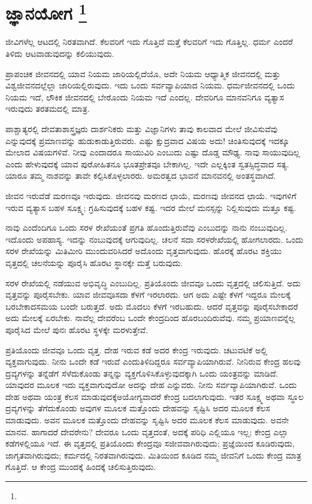 
\chapter[ಜ್ಞಾನಯೋಗ ]{ಜ್ಞಾನಯೋಗ \protect\footnote{}}

ಜೀವಿಗಳೆಲ್ಲ ಆಟದಲ್ಲಿ ನಿರತವಾಗಿದೆ. ಕೆಲವರಿಗೆ ಇದು ಗೊತ್ತಿದೆ ಮತ್ತೆ ಕೆಲವರಿಗೆ ಇದು ಗೊತ್ತಿಲ್ಲ. ಧರ್ಮ ಎಂದರೆ ತಿಳಿದು ಆಟವಾಡುವುದನ್ನು ಕಲಿಯುವುದು.

ಪ್ರಾಪಂಚಿಕ ಜೀವನದಲ್ಲಿ ಯಾವ ನಿಯಮ ಜಾರಿಯಲ್ಲಿದೆಯೊ, ಅದೇ ನಿಯಮ ಆಧ್ಯಾತ್ಮಿಕ ಜೀವನದಲ್ಲಿ ಮತ್ತು ವಿಶ್ವಜೀವನದಲ್ಲೆಲ್ಲಾ ಜಾರಿಯಲ್ಲಿರುವುದು. ಇದು ಒಂದು ಸರ್ವವ್ಯಾಪಿಯಾದ ನಿಯಮ. ಧರ್ಮಜೀವನದಲ್ಲಿ ಒಂದು ನಿಯಮ ಇದೆ, ಲೌಕಿಕ ಜೀವನದಲ್ಲಿ ಬೇರೊಂದು ನಿಯಮ ಇದೆ ಎಂದಲ್ಲ. ದೇವರಿಗೂ ಮಾನವನಿಗೂ ವ್ಯತ್ಯಾಸ ಇರುವುದು ತರತಮದಲ್ಲಿ ಮಾತ್ರ.

ಪಾಶ್ಚಾತ್ಯರಲ್ಲಿ ದೇವತಾಶಾಸ್ತ್ರಜ್ಞರು ದಾರ್ಶನಿಕರು ಮತ್ತು ವಿಜ್ಞಾನಿಗಳು ತಾವು ಕಾಲವಾದ ಮೇಲೆ ಜೀವಿಸುವೆವು ಎನ್ನುವುದಕ್ಕೆ ಪ್ರಮಾಣವನ್ನು ಹುಡುಕಾಡುತ್ತಿರುವರು. ಎಷ್ಟು ಕ್ಷುದ್ರವಾದ ವಿಷಯ ಅದು! ಚಿಂತಿಸುವುದಕ್ಕೆ ಇದಕ್ಕೂ ಮೇಲಾದ ವಿಷಯಗಳಿವೆ. ನೀವು ಎಂದಾದರೂ ಸಾಯುವಿರಿ ಎಂಬುದು ಎಷ್ಟು ದೊಡ್ಡ ಮೌಢ್ಯ. ನಾವು ಸಾಯುವುದಿಲ್ಲ ಎಂದು ಹೇಳುವುದಕ್ಕೆ ಯಾವ ಪುರೋಹಿತನೂ ಭೂತಪ್ರೇತವೂ ಬೇಕಾಗಿಲ್ಲ. ಇದೇ ಎಲ್ಲಕ್ಕಿಂತ ಸ್ವತಸ್ಸಿದ್ಧವಾದ ಸತ್ಯ. ಯಾರೂ ತಮ್ಮ ನಾಶವನ್ನು ತಾವೇ ಕಲ್ಪಿಸಿಕೊಳ್ಳಲಾರರು. ಅಮರತ್ವದ ಭಾವನೆ ಮಾನವನಲ್ಲಿ ಅಂತಸ್ಥವಾಗಿದೆ.

ಜೀವನ ಇರುವೆಡೆ ಮರಣವೂ ಇರುವುದು. ಜೀವನವು ಮರಣದ ಛಾಯೆ, ಮರಣವು ಜೀವನದ ಛಾಯೆ. ಇವುಗಳಿಗೆ ಇರುವ ವ್ಯತ್ಯಾಸ ಬಹಳ ಸೂಕ್ಷ್ಮ; ಗ್ರಹಿಸುವುದಕ್ಕೆ ಬಹಳ ಕಷ್ಟ. ಇದರ ಮೇಲೆ ಮನಸ್ಸನ್ನು ನಿಲ್ಲಿಸುವುದು ಮತ್ತೂ ಕಷ್ಟ.

ನಾವು ಎಂದೆಂದಿಗೂ ಒಂದು ಸರಳ ರೇಖೆಯಂತೆ ಪ್ರಗತಿ ಹೊಂದುತ್ತಿರುವೆವು ಎಂಬುದನ್ನು ನಾನು ನಂಬುವುದಿಲ್ಲ. ಇದೊಂದು ಅಪಹಾಸ್ಯ. ಇದನ್ನು ನಂಬುವುದಕ್ಕೆ ಆಗುವುದಿಲ್ಲ. ಚಲನೆ ಸದಾ ಸರಳರೇಖೆಯಲ್ಲಿ ಹೋಗಲಾರದು. ಒಂದು ಸರಳ ರೇಖೆಯನ್ನು ಮಿತಿಮೀರಿ ಮುಂದುವರಿಸಿದರೆ ಅದೊಂದು ವೃತ್ತವಾಗುವುದು. ಹೊರಕ್ಕೆ ಹೊರಟ ಶಕ್ತಿಯು ವೃತ್ತದಲ್ಲಿ ಚಲನೆಯನ್ನು ಪೂರೈಸಿ ಹೊರಟ ಸ್ಥಾನಕ್ಕೇ ಮತ್ತೆ ಬರುವುದು.

ಸರಳ ರೇಖೆಯಲ್ಲಿ ನಡೆಯುವ ಅಭಿವೃದ್ಧಿ ಎಂಬುದಿಲ್ಲ. ಪ್ರತಿಯೊಂದು ಜೀವವೂ ಒಂದು ವೃತ್ತದಲ್ಲಿ ಚಲಿಸುತ್ತಿದೆ. ಅದು ವೃತ್ತವನ್ನು ಪೂರೈಸಬೇಕು. ಯಾವ ಜೀವವೂ\break ಸದಾ ಕೆಳಗೆ ಇರಲಾರದು. ಆಗ ಅದು ಎಷ್ಟೇ ಕೆಳಗೆ ಇದ್ದರೂ ಮೇಲಕ್ಕೆ ಬರಬೇಕಾದ\break ಸಮಯ ಬಂದೇ ಬರುತ್ತದೆ. ಅದು ಮೊದಲು ಕೆಳಗೆ ಇರಬಹುದು. ಆದರೆ ವೃತ್ತವನ್ನು ಪೂರೈಸಬೇಕಾದರೆ ಅದು ಮೇಲಕ್ಕೆ ಏರಬೇಕು. ನಾವೆಲ್ಲ ದೇವರೆಂಬ ಒಂದೇ ಕೇಂದ್ರದಿಂದ ಹೊರಬಂದಿರುವೆವು. ನಮ್ಮ ಪ್ರಯಾಣವನ್ನೆಲ್ಲ ಪೂರೈಸಿದ ಮೇಲೆ ಪುನಃ ಹೊರಟ ಸ್ಥಳಕ್ಕೇ ಮರಳುತ್ತೇವೆ.

ಪ್ರತಿಯೊಂದು ಜೀವವೂ ಒಂದು ವೃತ್ತ. ದೇಹ ಇರುವ ಕಡೆ ಅದರ ಕೇಂದ್ರ ಇರುವುದು. ಚಟುವಟಿಕೆ ಅಲ್ಲಿ ವ್ಯಕ್ತವಾಗುವುದು. ನೀನು ಒಂದೇ ಕಡೆ ಇರುವೆ ಎಂದು\break ತಿಳಿದಿದ್ದರೂ ಸರ್ವವ್ಯಾಪಿಯಾಗಿರುವೆ. ನೀನಿರುವ ಕೇಂದ್ರ ಹಲವು ದ್ರವ್ಯಗಳನ್ನು ತನ್ನೆಡೆಗೆ ಸೆಳೆದುಕೊಂಡು ತನ್ನನ್ನು ವ್ಯಕ್ತಗೊಳಿಸಿಕೊಳ್ಳುವುದಕ್ಕಾಗಿ ಒಂದು ಯಂತ್ರವನ್ನು ಮಾಡಿದೆ. ಯಾವುದರ ಮೂಲಕ ಇದು ವ್ಯಕ್ತವಾಗುವುದೋ ಅದನ್ನು ದೇಹ ಎನ್ನುವರು. ನೀನು ಸರ್ವವ್ಯಾಪಿಯಾಗಿರುವೆ. ಒಂದು ದೇಹ ಅಥವಾ ಯಂತ್ರ ಕೆಲಸ ಮಾಡುವುದಕ್ಕೆ\break ಅಯೋಗ್ಯವಾದರೆ ಕೇಂದ್ರ ಬದಲಾಗುವುದು. ಇತರ ಸೂಕ್ಷ್ಮ ಅಥವಾ ಸ್ಥೂಲ ದ್ರವ್ಯಗಳನ್ನು ತೆಗೆದುಕೊಂಡು ಅವುಗಳ ಮೂಲಕ ಮತ್ತೊಂದು ದೇಹವನ್ನು ಸೃಷ್ಟಿಸಿ ಅದರ ಮೂಲಕ ಕೆಲಸ ಮಾಡುವುದು. ಅವನ ಮೂಲಕ ಮತ್ತೊಂದು ದೇಹವನ್ನು ಸೃಷ್ಟಿಸಿ ಅದರ ಮೂಲಕ ಕೆಲಸ ಮಾಡುವುದು. ಅವನೇ ಮಾನವ. ಹಾಗಾದರೆ ದೇವರೇನು? ದೇವರೂ ಒಂದು ವೃತ್ತದಂತೆ, ಅದಕ್ಕೆ ಪರಿಧಿ ಎಲ್ಲಿಯೂ ಇಲ್ಲ; ಕೇಂದ್ರ ಎಲ್ಲಾ ಕಡೆಗಳಲ್ಲಿಯೂ ಇದೆ. ಈ ವೃತ್ತದಲ್ಲಿ ಪ್ರತಿಯೊಂದು ಕೇಂದ್ರವೂ ಸಜೀವವಾಗಿರುವುದು; ಪ್ರಜ್ಞೆಯಿಂದ ಕೂಡಿರುವುದು, ಜಾಗೃತವಾಗಿರುವುದು; ಕರ್ಮದಲ್ಲಿ ನಿರತವಾಗಿರುವುದು. ಮಿತಿಯಿಂದ ಕೂಡಿದ ನಮ್ಮ ಜೀವನಿಗೆ ಒಂದು ಕೇಂದ್ರ ಮಾತ್ರ ಗೊತ್ತಿದೆ. ಆ ಕೇಂದ್ರ ಮುಂದಕ್ಕೆ ಹಿಂದಕ್ಕೆ ಚಲಿಸುತ್ತಿರುವುದು.

